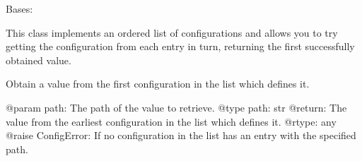 \documentclass[a4paper,10pt,english]{sphinxmanual}
\begin{document}
\begin{fulllineitems}
\label{\detokenize{commands/apidoc/src:src.pyconf.ConfigList}}
Bases: 

This class implements an ordered list of configurations and allows you
to try getting the configuration from each entry in turn, returning
the first successfully obtained value.

\begin{fulllineitems}
\label{\detokenize{commands/apidoc/src:src.pyconf.ConfigList.getByPath}}
Obtain a value from the first configuration in the list which defines
it.

@param path: The path of the value to retrieve.
@type path: str
@return: The value from the earliest configuration in the list which
defines it.
@rtype: any
@raise ConfigError: If no configuration in the list has an entry with
the specified path.

\end{fulllineitems}


\end{fulllineitems}

\end{document}
